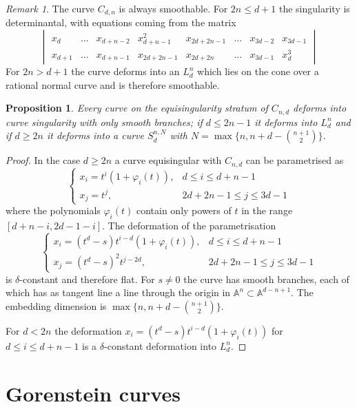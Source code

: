 \documentclass{amsart}
\newcommand{\A}{\mathbb{A}}
\newtheorem{prop}[thm]{Proposition}
\theoremstyle{definition}
\theoremstyle{remark}
\newtheorem{remark}[thm]{Remark}
\begin{document}
\begin{remark}
The curve $C_{d,n}$ is always smoothable. For $2n\leq d+1$ the singularity is determinantal,
with equations coming from the matrix
\[
\begin{vmatrix}
x_d      & \dots & x_{d+n-2}  & x_{d+n-1}^2 & x_{2d+2n-1} & \dots & x_{3d-2}&   x_{3d-1} \\
x_{d+1} & \dots & x_{d+n-1}& x_{2d+2n-1} & x_{2d+2n} & \dots & x_{3d-1}  &  x_d^3
\end{vmatrix}
\]
For $2n> d+1$ the curve deforms into an $L_d^n$
which lies on the cone over a rational normal curve and is therefore smoothable.
\end{remark}

\begin{prop}\label{prop:equisinsmooth}
Every curve on the equisingularity stratum of $C_{n,d}$ deforms into curve singularity with only smooth
branches; if $d\leq 2n-1$ it deforms into $L_d^n$ and if $d\geq 2n$ it deforms into a curve 
$S_d^{n,N}$ with  $N=\max\{n,n+d-\binom{n+1}2\}$.
\end{prop}


\begin{proof}
In the case $d\geq 2n$  a curve equisingular with $C_{n,d}$  can be param\-etrised 
as
\[
\begin{cases}
x_i = t^i(1 + \varphi_i(t)), &  d\leq i \leq d+n-1 \\
x_j = t^j ,                & 2d+2n-1\leq j \leq 3d-1
\end{cases}
\]
where the polynomials $\varphi_i(t)$ contain only powers of $t$ in the range $[d+n-i,2d-1-i]$.
The deformation of the parametrisation
\[
\begin{cases}
x_i = (t^d-s)t^{i-d}(1 + \varphi_i(t)), &  d\leq i \leq d+n-1 \\
x_j = (t^d-s)^2t^{j-2d} ,                & 2d+2n-1\leq j \leq 3d-1
\end{cases}
\]
is $\delta$-constant and therefore flat. For $s\neq0$ the curve has smooth branches,
each of which has as tangent line a line through the origin in $\A^n\subset \A^{d-n+1}$.
The embedding dimension is  $\max\{n,n+d-\binom{n+1}2\}$.

For $d<2n$ the deformation $x_i = (t^d-s)t^{i-d}(1 + \varphi_i(t))$ for  $ d\leq i \leq d+n-1$
is a $\delta$-constant deformation into $L_d^n$.
\end{proof}




\section{Gorenstein curves}
\end{document}
